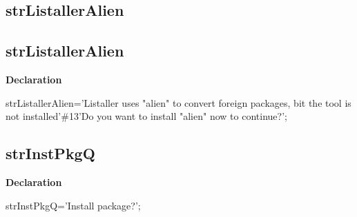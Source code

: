\documentclass{report}
\newif\ifpdf
\begin{document}
\subsection*{\large{\textbf{strListallerAlien}}\normalsize\hspace{1ex}\hrulefill}
\else
\subsection*{strListallerAlien}
\fi
\label{trstrings-strListallerAlien}
\begin{list}{}{
\setlength{\itemindent}{0cm}
\setlength{\listparindent}{0cm}
\setlength{\leftmargin}{\evensidemargin}
\addtolength{\leftmargin}{\tmplength}
\settowidth{\labelsep}{X}
\addtolength{\leftmargin}{\labelsep}
\setlength{\labelwidth}{\tmplength}
}
\item[\textbf{Declaration}\hfill]
\ifpdf
\begin{flushleft}
\fi
\begin{ttfamily}
strListallerAlien='Listaller uses "alien" to convert foreign packages, bit the tool is not installed'{\#}13'Do you want to install "alien" now to continue?';\end{ttfamily}

\ifpdf
\end{flushleft}
\fi

\end{list}
\ifpdf
\subsection*{\large{\textbf{strInstPkgQ}}\normalsize\hspace{1ex}\hrulefill}
\else
\subsection*{strInstPkgQ}
\fi
\label{trstrings-strInstPkgQ}
\begin{list}{}{
\setlength{\itemindent}{0cm}
\setlength{\listparindent}{0cm}
\setlength{\leftmargin}{\evensidemargin}
\addtolength{\leftmargin}{\tmplength}
\settowidth{\labelsep}{X}
\addtolength{\leftmargin}{\labelsep}
\setlength{\labelwidth}{\tmplength}
}
\item[\textbf{Declaration}\hfill]
\ifpdf
\begin{flushleft}
\fi
\begin{ttfamily}
strInstPkgQ='Install package?';\end{ttfamily}

\ifpdf
\end{flushleft}
\fi

\end{list}
\ifpdf
\end{document}

